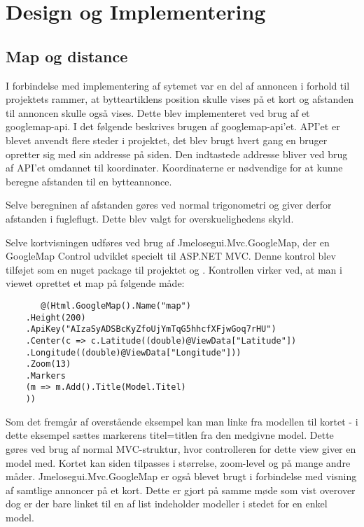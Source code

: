 \chapter{Design og Implementering}

\section{Map og distance}
I forbindelse med implementering af sytemet var en del af annoncen i forhold til projektets rammer, at bytteartiklens position skulle vises på et kort og afstanden til annoncen skulle også vises. Dette blev implementeret ved brug af et googlemap-api.
I det følgende beskrives brugen af googlemap-api'et. API'et er blevet anvendt flere steder i projektet, det blev brugt hvert gang en bruger opretter sig med sin addresse på siden. Den indtastede addresse bliver ved brug af API'et omdannet til koordinater. Koordinaterne er nødvendige for at kunne beregne afstanden til en bytteannonce.

Selve beregninen af afstanden gøres ved normal trigonometri og giver derfor afstanden i fugleflugt. Dette blev valgt for overskuelighedens skyld. 

Selve kortvisningen udføres ved brug af Jmelosegui.Mvc.GoogleMap, der en GoogleMap Control udviklet specielt til ASP.NET MVC. Denne kontrol blev tilføjet som en nuget package til projektet og . Kontrollen virker ved, at man i viewet oprettet et map på følgende måde:
\begin{verbatim}
	   @(Html.GoogleMap().Name("map")
	.Height(200)
	.ApiKey("AIzaSyADSBcKyZfoUjYmTqG5hhcfXFjwGoq7rHU")
	.Center(c => c.Latitude((double)@ViewData["Latitude"])
	.Longitude((double)@ViewData["Longitude"]))
	.Zoom(13)
	.Markers
	(m => m.Add().Title(Model.Titel)
	))
\end{verbatim}

Som det fremgår af overstående eksempel kan man linke fra modellen til kortet - i dette eksempel sættes markerens titel=titlen fra den medgivne model. Dette gøres ved brug af normal MVC-struktur, hvor controlleren for dette view giver en model med. Kortet kan siden tilpasses i størrelse, zoom-level og på mange andre måder.
Jmelosegui.Mvc.GoogleMap er også blevet brugt i forbindelse med visning af samtlige annoncer på et kort. Dette er gjort på samme møde som vist overover dog er der bare linket til en af list indeholder modeller i stedet for en enkel model.


